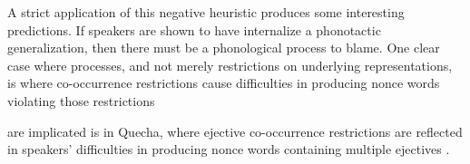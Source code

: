 A strict application of this negative heuristic produces some interesting predictions. If speakers are shown to have internalize a phonotactic generalization, then there must be a phonological process to blame. One clear case where processes, and not merely restrictions on underlying representations, 
is where co-occurrence restrictions cause difficulties in producing nonce words violating those restrictions
\citep{Rose2007,GallagherInPress}

are implicated is in Quecha, where ejective co-occurrence restrictions are reflected in speakers' difficulties in producing nonce words containing multiple ejectives \citep{GallagherInPress}. 

